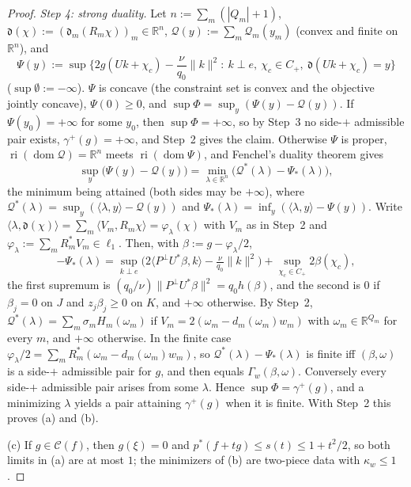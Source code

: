 \documentclass[10pt]{amsart}
\theoremstyle{definition}
\theoremstyle{remark}
\newcommand{\R}{\mathbb R}
\newcommand{\Cset}{\mathcal C}
\newcommand{\ip}[2]{\langle #1,#2\rangle}
\begin{document}
\begin{proof}
\emph{Step 4: strong duality.}  Let $n:=\sum_m(|Q_m|+1)$,
$\mathfrak d(\chi):=(\mathfrak d_m(R_m\chi))_m\in\R^n$,
$\mathcal Q(y):=\sum_m\mathcal Q_m(y_m)$ (convex and finite on $\R^n$), and
\[
 \Psi(y):=\sup\Big\{2g(Uk+\chi_c)-\frac\nu{q_0}\|k\|^2:\ k\perp e,\ \chi_c\in
 C_+,\ \mathfrak d(Uk+\chi_c)=y\Big\}
\]
($\sup\emptyset:=-\infty$).
$\Psi$ is concave (the constraint set is convex and the objective jointly
concave), $\Psi(0)\ge0$, and $\sup\Phi=\sup_y(\Psi(y)-\mathcal Q(y))$.  If
$\Psi(y_0)=+\infty$ for some $y_0$, then $\sup\Phi=+\infty$, so by Step~3 no
side-$+$ admissible pair exists, $\gamma^+(g)=+\infty$, and Step~2 gives
the claim.  Otherwise $\Psi$ is proper, $\operatorname{ri}(\operatorname{dom}
\mathcal Q)=\R^n$ meets $\operatorname{ri}(\operatorname{dom}\Psi)$, and
Fenchel's duality theorem \cite[Theorem~31.1]{Rockafellar} gives
\[
 \sup_y\big(\Psi(y)-\mathcal Q(y)\big)=\min_{\lambda\in\R^n}\big(\mathcal
 Q^*(\lambda)-\Psi_*(\lambda)\big),
\]
the minimum being attained (both sides may be $+\infty$), where $\mathcal
Q^*(\lambda)=\sup_y(\ip\lambda y-\mathcal Q(y))$ and $\Psi_*(\lambda)=
\inf_y(\ip\lambda y-\Psi(y))$.  Write $\ip{\lambda}{\mathfrak d(\chi)}=
\sum_m\ip{V_m}{R_m\chi}=\varphi_\lambda(\chi)$ with $V_m$ as in Step~2 and
$\varphi_\lambda:=\sum_mR_m^*V_m\in\ell_1$.  Then, with
$\beta:=g-\varphi_\lambda/2$,
\[
 -\Psi_*(\lambda)=\sup_{k\perp e}\big(2\ip{P^\perp U^*\beta}{k}-\tfrac\nu{q_0}
 \|k\|^2\big)+\sup_{\chi_c\in C_+}2\beta(\chi_c),
\]
the first supremum is $(q_0/\nu)\|P^\perp U^*\beta\|^2=q_0h(\beta)$, and the
second is $0$ if $\beta_j=0$ on $J$ and $z_j\beta_j\ge0$ on $K$, and
$+\infty$ otherwise.  By Step~2, $\mathcal Q^*(\lambda)=\sum_m\sigma_m
H_m(\omega_m)$ if $V_m=2(\omega_m-d_m(\omega_m)w_m)$ with $\omega_m\in
\R^{Q_m}$ for every $m$, and $+\infty$ otherwise.  In the finite case
$\varphi_\lambda/2=\sum_mR_m^*(\omega_m-d_m(\omega_m)w_m)$, so
$\mathcal Q^*(\lambda)-\Psi_*(\lambda)$ is finite iff $(\beta,\omega)$ is a
side-$+$ admissible pair for $g$, and then equals $\Gamma_w(\beta,\omega)$.
Conversely every side-$+$ admissible pair arises from some $\lambda$.
Hence $\sup\Phi=\gamma^+(g)$, and a minimizing $\lambda$ yields a pair
attaining $\gamma^+(g)$ when it is finite.  With Step~2 this proves (a)
and (b).

(c) If $g\in\Cset(f)$, then $g(\xi)=0$ and $p^*(f+tg)\le s(t)\le1+t^2/2$, so
both limits in (a) are at most $1$; the minimizers of (b) are two-piece data
with $\kappa_w\le1$.
\end{proof}
\end{document}
